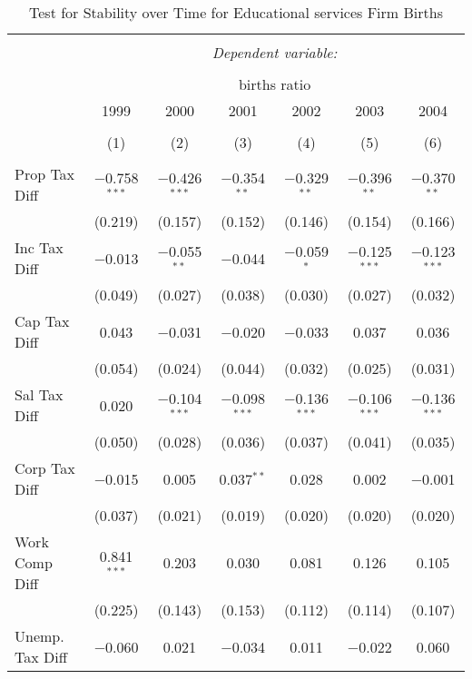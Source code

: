 
\begin{table}[!htbp] \centering 
  \caption{Test for Stability over Time for  Educational services Firm Births} 
  \label{61year} 
\small 
\begin{tabular}{@{\extracolsep{5pt}}lcccccc} 
\\[-1.8ex]\hline 
\hline \\[-1.8ex] 
 & \multicolumn{6}{c}{\textit{Dependent variable:}} \\ 
\cline{2-7} 
\\[-1.8ex] & \multicolumn{6}{c}{births ratio} \\ 
 & 1999 & 2000 & 2001 & 2002 & 2003 & 2004 \\ 
\\[-1.8ex] & (1) & (2) & (3) & (4) & (5) & (6)\\ 
\hline \\[-1.8ex] 
 Prop Tax Diff & $-$0.758$^{***}$ & $-$0.426$^{***}$ & $-$0.354$^{**}$ & $-$0.329$^{**}$ & $-$0.396$^{**}$ & $-$0.370$^{**}$ \\ 
  & (0.219) & (0.157) & (0.152) & (0.146) & (0.154) & (0.166) \\ 
  Inc Tax Diff & $-$0.013 & $-$0.055$^{**}$ & $-$0.044 & $-$0.059$^{*}$ & $-$0.125$^{***}$ & $-$0.123$^{***}$ \\ 
  & (0.049) & (0.027) & (0.038) & (0.030) & (0.027) & (0.032) \\ 
  Cap Tax Diff & 0.043 & $-$0.031 & $-$0.020 & $-$0.033 & 0.037 & 0.036 \\ 
  & (0.054) & (0.024) & (0.044) & (0.032) & (0.025) & (0.031) \\ 
  Sal Tax Diff & 0.020 & $-$0.104$^{***}$ & $-$0.098$^{***}$ & $-$0.136$^{***}$ & $-$0.106$^{***}$ & $-$0.136$^{***}$ \\ 
  & (0.050) & (0.028) & (0.036) & (0.037) & (0.041) & (0.035) \\ 
  Corp Tax Diff & $-$0.015 & 0.005 & 0.037$^{**}$ & 0.028 & 0.002 & $-$0.001 \\ 
  & (0.037) & (0.021) & (0.019) & (0.020) & (0.020) & (0.020) \\ 
  Work Comp Diff & 0.841$^{***}$ & 0.203 & 0.030 & 0.081 & 0.126 & 0.105 \\ 
  & (0.225) & (0.143) & (0.153) & (0.112) & (0.114) & (0.107) \\ 
  Unemp. Tax Diff & $-$0.060 & 0.021 & $-$0.034 & 0.011 & $-$0.022 & 0.060 \\ 

\end{tabular}
\end{table}
